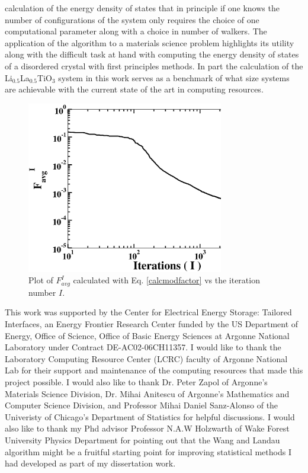 \documentclass[aps,pre,reprint,superscriptaddress,showkeys]{revtex4-2}
\begin{document}
calculation of the energy density of states that in principle if one knows the number of configurations of the system only requires the choice of one computational parameter along with a choice in number of walkers. The application of the algorithm to a materials science problem highlights its utility along with the difficult task at hand with computing the energy density of states of a disordered crystal with first principles methods. In part the calculation of the Li$_{0.5}$La$_{0.5}$TiO$_{3}$ system in this work serves as a benchmark of what size systems are achievable with the current state of the art in computing resources. 
 
 \begin{figure}[h!]
\includegraphics[width=8.6cm]{fig12.eps}
\caption{Plot of $F_{avg}^I$ calculated with Eq. \ref{calcmodfactor} vs the iteration number $I$.  \label{modfactor_LLTO}}
\end{figure}

\begin{acknowledgments}
This work was supported by the Center for Electrical Energy Storage: Tailored Interfaces, an Energy Frontier Research Center funded 
by the US Department of Energy, Office of Science, Office of Basic Energy Sciences at Argonne National Laboratory under Contract DE-AC02-06CH11357.
I would like to thank the Laboratory Computing Resource Center (LCRC) faculty of Argonne National Lab for their support and maintenance of the computing resources that made this project possible. I would also like to thank Dr. Peter Zapol of Argonne's Materials Science Division, Dr. Mihai Anitescu of Argonne's Mathematics and Computer Science Division, and Professor Mihai Daniel Sanz-Alonso of the Univeristy of Chicago's Department of Statistics for helpful discussions. I would also like to thank my Phd advisor Professor N.A.W Holzwarth of Wake Forest University Physics Department for pointing out that the Wang and Landau algorithm might be a fruitful starting point for improving statistical methods I had developed as part of my dissertation work. 
\end{acknowledgments}



\end{document}
